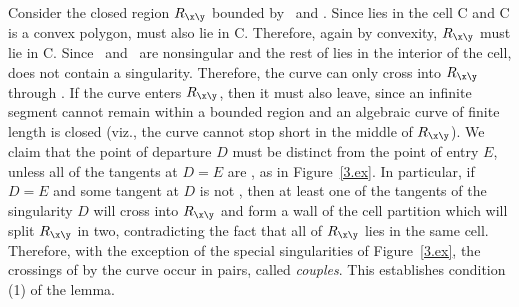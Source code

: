 Consider the closed region $R_{\x\y}$ bounded by \seg{\x\y}\ and \arc{\x\y}.
Since \arc{\x\y} lies in the cell C and C is a convex polygon, \seg{\x\y} 
must also lie in C.
Therefore, again by convexity, $R_{\x\y}$ must lie in C.
%
Since \x\ and \y\ are nonsingular and the rest of \arc{\x\y} lies in the
interior of the cell, \arc{\x\y} does not contain a singularity.
Therefore, the curve can only cross into $R_{\x\y}$ through \seg{\x\y}.
If the curve enters $R_{\x\y}$, then it must also leave, since an infinite 
segment cannot remain within a bounded region and an algebraic curve of finite
length is closed (viz., the curve cannot stop short in the middle of $R_{\x\y}$).
We claim that the point of departure $D$ must be distinct from the point of 
entry $E$, unless all of the tangents at $D=E$ are , as in 
Figure~\ref{3.ex}.
In particular, if $D=E$ and some tangent at $D$ is not , 
then at least one of the tangents of the singularity $D$ 
will cross into $R_{\x\y}$ and form a wall of the cell partition which will 
split $R_{\x\y}$ in two, contradicting the fact that all of $R_{\x\y}$ 
lies in the same cell.
Therefore, with the exception of the special singularities of 
Figure~\ref{3.ex}, the crossings of \seg{\x\y} by the curve occur in pairs,
called {\em couples}.
This establishes condition (1) of the lemma.


